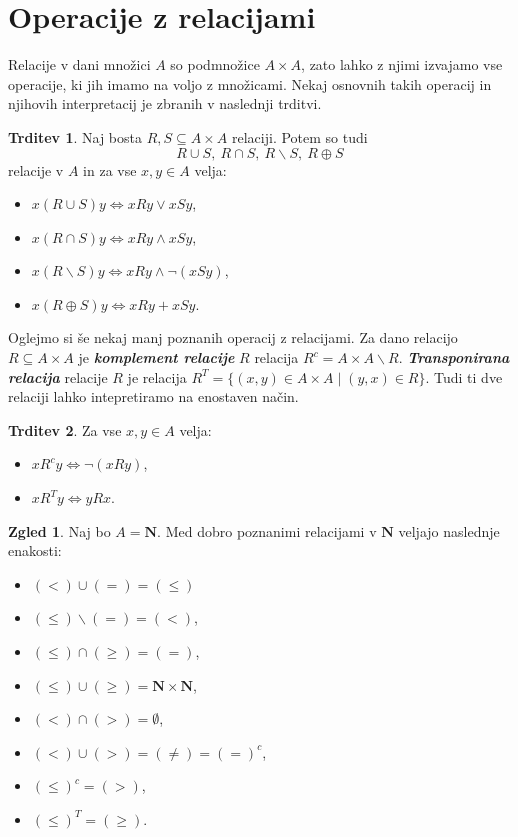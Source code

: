 \documentclass[11pt]{book}
\def\NN{\mathbf{N}}
\def\definicija{\color{rdeca}\bf\em}
\theoremstyle{definition}
\theoremstyle{zgled}
\newtheorem*{zgled}{Zgled}
\theoremstyle{odprtproblem}
\theoremstyle{domacanaloga}
\theoremstyle{izrek}
\newtheorem*{trditev}{Trditev}
\begin{document}
\section{Operacije z relacijami}

Relacije v dani množici $A$ so podmnožice $A \times A$, zato lahko z njimi izvajamo vse operacije, ki jih imamo na voljo z množicami. Nekaj osnovnih takih operacij in njihovih interpretacij je zbranih v naslednji trditvi.

\begin{trditev}
Naj bosta $R,S \subseteq A \times A$ relaciji. Potem so tudi
\[
    R \cup S, \
    R \cap S, \
    R \backslash S, \
    R \oplus S
\]
relacije v $A$ in za vse $x,y \in A$ velja:
\begin{itemize}
    \item $x(R \cup S) y \Leftrightarrow x R y \lor x S y$,
    \item $x(R \cap S) y \Leftrightarrow x R y \land x S y$,
    \item $x(R \backslash S) y \Leftrightarrow x R y \land \lnot (x S y)$,
    \item $x(R \oplus S) y \Leftrightarrow x R y + x S y$.
\end{itemize}
\end{trditev}

Oglejmo si še nekaj manj poznanih operacij z relacijami. Za dano relacijo $R \subseteq A \times A$ je {\definicija komplement relacije} $R$ relacija $R^c = A \times A \backslash R$. {\definicija Transponirana relacija} relacije $R$ je relacija $R^T = \{ (x,y) \in A \times A \mid (y,x) \in R \}$. Tudi ti dve relaciji lahko intepretiramo na enostaven način.

\begin{trditev}
Za vse $x,y \in A$ velja:
    \begin{itemize}
        \item $x R^c y \Leftrightarrow \lnot (x R y)$,
        \item $x R^T y \Leftrightarrow y R x$.
    \end{itemize}
\end{trditev}

\begin{zgled}
Naj bo $A = \NN$. Med dobro poznanimi relacijami v $\NN$ veljajo naslednje enakosti:
\begin{itemize}
    \item $(<) \cup (=) = (\leq)$
    \item $(\leq) \backslash (=) = (<)$,
    \item $(\leq) \cap (\geq) = (=)$,
    \item $(\leq) \cup (\geq) = \NN \times \NN$,
    \item $(<) \cap (>) = \emptyset$,
    \item $(<) \cup (>) = (\neq) = (=)^c$,
    \item $(\leq)^c = (>)$,
    \item $(\leq)^T = (\geq)$.
\end{itemize}
\end{zgled}
\end{document}

